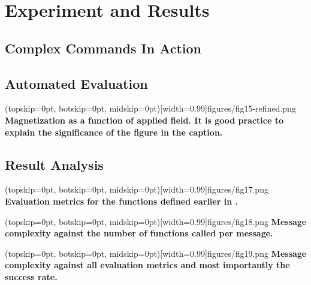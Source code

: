 \documentclass{ieeeaccess}
\begin{document}







\section{Experiment and Results}
\label{sec:experiment}


\subsection{Complex Commands In Action}



\subsection{Automated Evaluation}
\Figure[t!](topskip=0pt, botskip=0pt, midskip=0pt)[width=0.99\columnwidth]{{figures/fig15-refined.png}}
{ \textbf{Magnetization as a function of applied field.
It is good practice to explain the significance of the figure in the caption.}\label{fig6}}
\subsection{Result Analysis}

\Figure[t!](topskip=0pt, botskip=0pt,
midskip=0pt)[width=0.99\columnwidth]{{figures/fig17.png}}
{ \textbf{Evaluation metrics for the functions defined earlier in .}\label{fig7}}

\Figure[t!](topskip=0pt, botskip=0pt,
midskip=0pt)[width=0.99\columnwidth]{{figures/fig18.png}}
{ \textbf{Message complexity against the number of functions called per message.}\label{fig8}}

\Figure[t!](topskip=0pt, botskip=0pt,
midskip=0pt)[width=0.99\columnwidth]{{figures/fig19.png}}
{ \textbf{Message complexity against all evaluation metrics and most importantly the success rate.}\label{fig9}}
\end{document}
